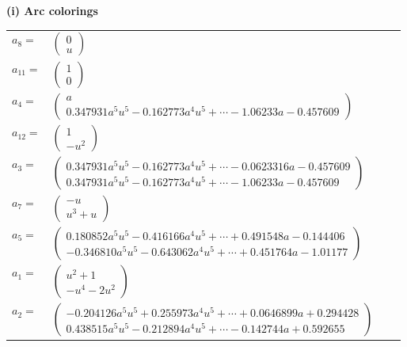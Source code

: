 \documentclass[1p]{elsarticle_modified}
\theoremstyle{definition}
\begin{document}
\flushleft \textbf{(i) Arc colorings}\\
\begin{tabular}{m{7pt} m{180pt} m{7pt} m{180pt} }
\flushright $a_{8}=$&$\begin{pmatrix}0\\u\end{pmatrix}$ \\
\flushright $a_{11}=$&$\begin{pmatrix}1\\0\end{pmatrix}$ \\
\flushright $a_{4}=$&$\begin{pmatrix}a\\0.347931 a^{5} u^{5}-0.162773 a^{4} u^{5}+\cdots-1.06233 a-0.457609\end{pmatrix}$ \\
\flushright $a_{12}=$&$\begin{pmatrix}1\\- u^2\end{pmatrix}$ \\
\flushright $a_{3}=$&$\begin{pmatrix}0.347931 a^{5} u^{5}-0.162773 a^{4} u^{5}+\cdots-0.0623316 a-0.457609\\0.347931 a^{5} u^{5}-0.162773 a^{4} u^{5}+\cdots-1.06233 a-0.457609\end{pmatrix}$ \\
\flushright $a_{7}=$&$\begin{pmatrix}- u\\u^3+u\end{pmatrix}$ \\
\flushright $a_{5}=$&$\begin{pmatrix}0.180852 a^{5} u^{5}-0.416166 a^{4} u^{5}+\cdots+0.491548 a-0.144406\\-0.346810 a^{5} u^{5}-0.643062 a^{4} u^{5}+\cdots+0.451764 a-1.01177\end{pmatrix}$ \\
\flushright $a_{1}=$&$\begin{pmatrix}u^2+1\\- u^4-2 u^2\end{pmatrix}$ \\
\flushright $a_{2}=$&$\begin{pmatrix}-0.204126 a^{5} u^{5}+0.255973 a^{4} u^{5}+\cdots+0.0646899 a+0.294428\\0.438515 a^{5} u^{5}-0.212894 a^{4} u^{5}+\cdots-0.142744 a+0.592655\end{pmatrix}$ \\

\end{tabular}
\end{document}
